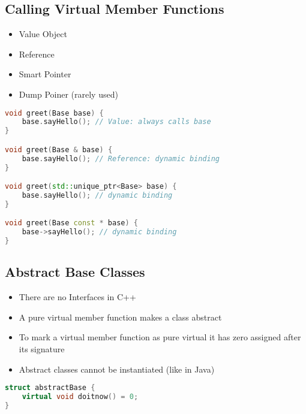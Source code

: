 \subsection{Calling Virtual Member Functions}
\begin{itemize}
  \itemsep -0.5em 
  \item Value Object
  \item	Reference
  \item Smart Pointer
  \item Dump Poiner (rarely used)
\end{itemize}

\begin{lstlisting}[language=C++]
void greet(Base base) {
	base.sayHello(); // Value: always calls base
}

void greet(Base & base) {
	base.sayHello(); // Reference: dynamic binding
}

void greet(std::unique_ptr<Base> base) {
	base.sayHello(); // dynamic binding
}

void greet(Base const * base) {
	base->sayHello(); // dynamic binding
}
\end{lstlisting}

\subsection{Abstract Base Classes}
\begin{itemize}
  \itemsep -0.5em 
  \item There are no Interfaces in C++
  \item A pure virtual member function makes a class abstract
  \item To mark a virtual member function as pure virtual it has zero assigned after its signature
  \item Abstract classes cannot be instantiated (like in Java)
\end{itemize}

\begin{lstlisting}[language=C++]
struct abstractBase {
	virtual void doitnow() = 0;
}
\end{lstlisting}



